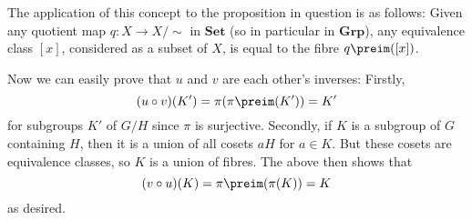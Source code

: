 \documentclass[article, a4paper, 11pt, oneside]{memoir}
\numberwithin{equation}{chapter}
\newcommand{\ncat}[1]{\mathbf{#1}} %
\newcommand{\catSet}{\ncat{Set}} %
\newcommand{\catGrp}{\ncat{Grp}} %
\theoremstyle{nonumberplain}
\begin{document}
\begin{remark}
    The application of this concept to the proposition in question is as follows: Given any quotient map $q \colon X \to X/{\sim}$ in $\catSet$ (so in particular in $\catGrp$), any equivalence class $[x]$, considered as a subset of $X$, is equal to the fibre $q\preim([x])$.

    Now we can easily prove that $u$ and $v$ are each other's inverses: Firstly,
    \begin{equation*}
        (u \circ v)(K') = \pi(\pi\preim(K')) = K'
    \end{equation*}
    for subgroups $K'$ of $G/H$ since $\pi$ is surjective. Secondly, if $K$ is a subgroup of $G$ containing $H$, then it is a union of all cosets $aH$ for $a \in K$. But these cosets are equivalence classes, so $K$ is a union of fibres. The above then shows that
    \begin{equation*}
        (v \circ u)(K) = \pi\preim(\pi(K)) = K
    \end{equation*}
    as desired.
\end{remark}
\end{document}
